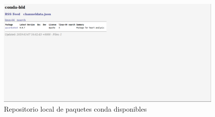 \begin{figure}[H]
    \centering
    \includegraphics[scale=0.35]{img/condaLocalChannel.png}
    \caption{Repositorio local de paquetes conda disponibles}
    \label{fig:condaChannelLocal}
\end{figure}
